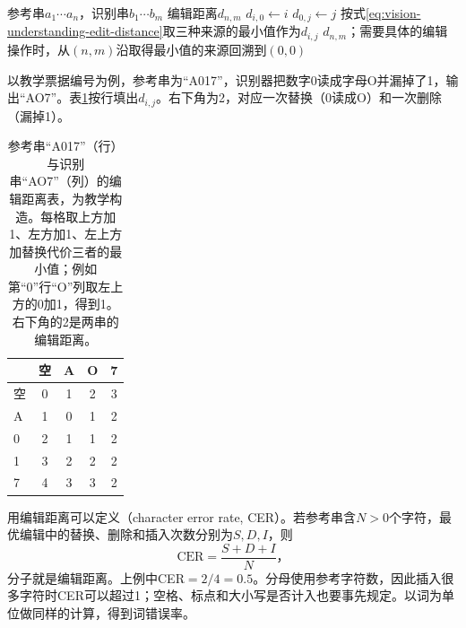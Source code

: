 \begin{algorithm}[字符串编辑距离的动态规划计算]
  \label{alg:vision-understanding-edit-distance}
  \begin{algorithmic}[1]
    \Require 参考串$a_1\cdots a_n$，识别串$b_1\cdots b_m$
    \Ensure 编辑距离$d_{n,m}$
      \State $d_{i,0}\gets i$
    \EndFor
      \State $d_{0,j}\gets j$
    \EndFor
        \State 按式\eqref{eq:vision-understanding-edit-distance}取三种来源的最小值作为$d_{i,j}$
      \EndFor
    \EndFor
    \State \Return $d_{n,m}$；需要具体的编辑操作时，从$(n,m)$沿取得最小值的来源回溯到$(0,0)$
  \end{algorithmic}
\end{algorithm}

以教学票据编号为例，参考串为“A017”，识别器把数字0读成字母O并漏掉了1，输出“AO7”。表\ref{tab:vision-understanding-edit-example}按行填出$d_{i,j}$。右下角为2，对应一次替换（0读成O）和一次删除（漏掉1）。

\begin{table}[htbp]
  \centering
  \small
  \begin{tabular}{@{}lcccc@{}}
    \toprule
     & 空 & A & O & 7\\
    \midrule
    空 & 0 & 1 & 2 & 3\\
    A & 1 & 0 & 1 & 2\\
    0 & 2 & 1 & 1 & 2\\
    1 & 3 & 2 & 2 & 2\\
    7 & 4 & 3 & 3 & 2\\
    \bottomrule
  \end{tabular}
  \caption{参考串“A017”（行）与识别串“AO7”（列）的编辑距离表，为教学构造。每格取上方加1、左方加1、左上方加替换代价三者的最小值；例如第“0”行“O”列取左上方的0加1，得到1。右下角的2是两串的编辑距离。}
  \label{tab:vision-understanding-edit-example}
\end{table}

用编辑距离可以定义（character error rate, CER）。若参考串含$N>0$个字符，最优编辑中的替换、删除和插入次数分别为$S,D,I$，则
\begin{equation}
  \mathrm{CER}=\frac{S+D+I}{N}\text{，}
  \label{eq:vision-cer}
\end{equation}
分子就是编辑距离。上例中CER$=2/4=0.5$。分母使用参考字符数，因此插入很多字符时CER可以超过1；空格、标点和大小写是否计入也要事先规定。以词为单位做同样的计算，得到词错误率。

